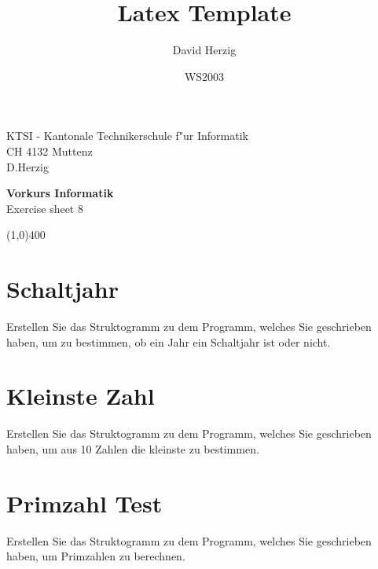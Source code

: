 \documentclass[a4paper,10pt]{article}
\title{Latex Template}
\author{David Herzig}
\date{WS2003}
\begin{document}
KTSI - Kantonale Technikerschule f"ur Informatik\\
CH 4132 Muttenz\\
D.Herzig

\vspace{2mm}

\begin{center}
{\Large \bf Vorkurs Informatik}\\
Exercise sheet 8
\end{center}

\vspace{2mm}

\line(1,0){400}

\vspace{5mm}

\section{Schaltjahr}
Erstellen Sie das Struktogramm zu dem Programm, welches Sie geschrieben haben, um zu bestimmen, ob ein Jahr ein
Schaltjahr ist oder nicht.

\section{Kleinste Zahl}
Erstellen Sie das Struktogramm zu dem Programm, welches Sie geschrieben haben, um aus 10
Zahlen die kleinste zu bestimmen.

\section{Primzahl Test}
Erstellen Sie das Struktogramm zu dem Programm, welches Sie geschrieben haben, um Primzahlen
zu berechnen.
\end{document}
